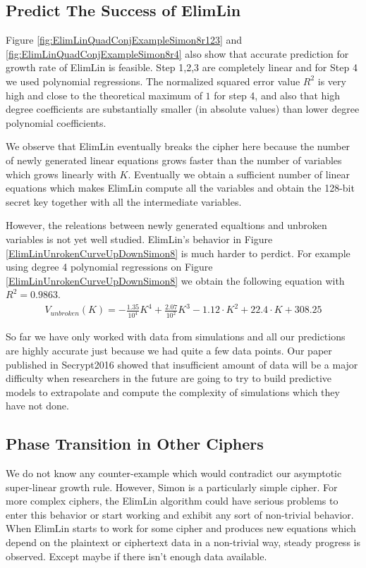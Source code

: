 \subsection{Predict The Success of ElimLin}

Figure \ref{fig:ElimLinQuadConjExampleSimon8r123} and \ref{fig:ElimLinQuadConjExampleSimon8r4} also show that accurate prediction for growth rate of ElimLin is feasible. Step 1,2,3 are completely linear and for Step 4 we used polynomial regressions. The normalized squared error value $R^2$ is very high and close to the theoretical maximum of $1$ for step 4, and also that high degree coefficients are substantially smaller (in absolute values) than lower degree polynomial coefficients.

We observe that
ElimLin eventually breaks the cipher here because
the number of newly generated linear equations grows
faster
than the number of variables which grows linearly with $K$.
Eventually we obtain a sufficient number of linear equations which makes ElimLin
compute all the variables and obtain the 128-bit secret key together with all the intermediate variables.

However, the releations between newly generated equaltions and unbroken variables is not yet well studied. ElimLin's behavior in Figure \ref{ElimLinUnrokenCurveUpDownSimon8} is much harder to perdict. For example using degree 4 polynomial regressions on Figure \ref{ElimLinUnrokenCurveUpDownSimon8} we obtain the following equation with $R^2=0.9863$.
\begin{multline}
V_{unbroken}(K)=
-\frac{1.35}{10^4}
K^4
+
\frac{2.07}{10^2}
K^3
-
1.12\cdot K^2+
22.4\cdot K + 308.25
\end{multline}

So far we have only worked with data from simulations
and all our predictions are highly accurate just because we had quite a few data points. Our paper published in Secrypt2016 \cite{secrypt2016} showed that insufficient amount of data will be a major difficulty when researchers in the future are going to try to build predictive models to extrapolate and compute the complexity of simulations which they have not done.

\subsection{Phase Transition in Other Ciphers}
We do not know any %
counter-example which would contradict our asymptotic super-linear growth rule.
However, Simon is a particularly simple cipher. For more complex ciphers,
the ElimLin algorithm could have serious problems to enter this behavior
or start working and exhibit any sort of non-trivial behavior.
When ElimLin starts to work for some cipher and produces new equations
which depend on the plaintext or ciphertext data in a non-trivial way,
steady progress is observed.
Except maybe if there isn't enough data available.

